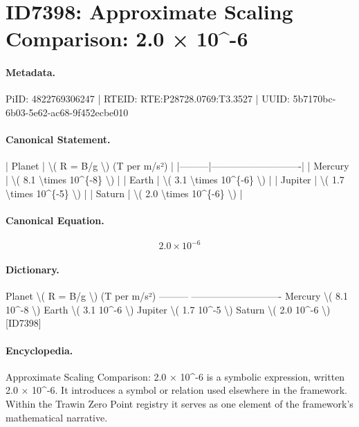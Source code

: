 \section*{ID7398: Approximate Scaling Comparison: 2.0 × 10\textasciicircum{}-6}
\paragraph{Metadata.}
PiID: 4822769306247 | RTEID: RTE:P28728.0769:T3.3527 | UUID: 5b7170bc-6b03-5e62-ac68-9f452ecbe010

\paragraph{Canonical Statement.}
| Planet | \textbackslash{}( R = B/g \textbackslash{}) (T per m/s²) | |---------|----------------------------| | Mercury | \textbackslash{}( 8.1 \textbackslash{}times 10\textasciicircum{}\{-8\} \textbackslash{}) | | Earth | \textbackslash{}( 3.1 \textbackslash{}times 10\textasciicircum{}\{-6\} \textbackslash{}) | | Jupiter | \textbackslash{}( 1.7 \textbackslash{}times 10\textasciicircum{}\{-5\} \textbackslash{}) | | Saturn | \textbackslash{}( 2.0 \textbackslash{}times 10\textasciicircum{}\{-6\} \textbackslash{}) |

\paragraph{Canonical Equation.}
\[
2.0 \times 10^{-6}
\]

\paragraph{Dictionary.}
Planet \textbackslash{}( R = B/g \textbackslash{}) (T per m/s²) --------- ---------------------------- Mercury \textbackslash{}( 8.1 10\textasciicircum{}-8 \textbackslash{}) Earth \textbackslash{}( 3.1 10\textasciicircum{}-6 \textbackslash{}) Jupiter \textbackslash{}( 1.7 10\textasciicircum{}-5 \textbackslash{}) Saturn \textbackslash{}( 2.0 10\textasciicircum{}-6 \textbackslash{}) [ID7398]

\paragraph{Encyclopedia.}
Approximate Scaling Comparison: 2.0 × 10\textasciicircum{}-6 is a symbolic expression, written 2.0 × 10\textasciicircum{}-6. It introduces a symbol or relation used elsewhere in the framework. Within the Trawin Zero Point registry it serves as one element of the framework's mathematical narrative.
